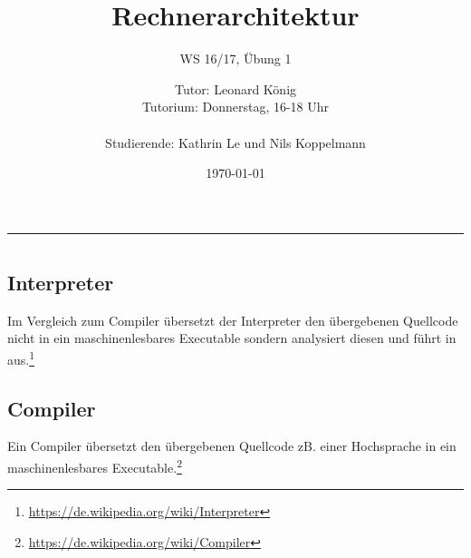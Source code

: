 \documentclass[
	11pt,								%
	parskip=half-,						%
	paper=a4,							%
	english,ngerman,					%
	]{scrartcl}							%
\begin{document}
\begin{titlepage}
	\subject{Jochen Schiller}					%
	\title{Rechnerarchitektur}	%
	\subtitle{\Large WS 16/17, Übung 1}	%
	\author{%
    	Tutor: Leonard König\\			%
        Tutorium: Donnerstag, 16-18 Uhr\\ \\	%
        Studierende: Kathrin Le und Nils Koppelmann}		%
	\date{\normalsize \today}					%
\end{titlepage}

\maketitle								%
\vspace*{-11cm}							%

\vspace{8.2cm}							%
\rule{\linewidth}{0.8pt}				%

\section*{}

\subsection*{Interpreter}
Im Vergleich zum Compiler übersetzt der Interpreter den übergebenen Quellcode nicht in ein maschinenlesbares Executable sondern analysiert diesen und führt in aus.\footnote{\url{https://de.wikipedia.org/wiki/Interpreter}}

\subsection*{Compiler}
Ein Compiler übersetzt den übergebenen Quellcode zB. einer Hochsprache in ein maschinenlesbares Executable.\footnote{\url{https://de.wikipedia.org/wiki/Compiler}}
\end{document}

